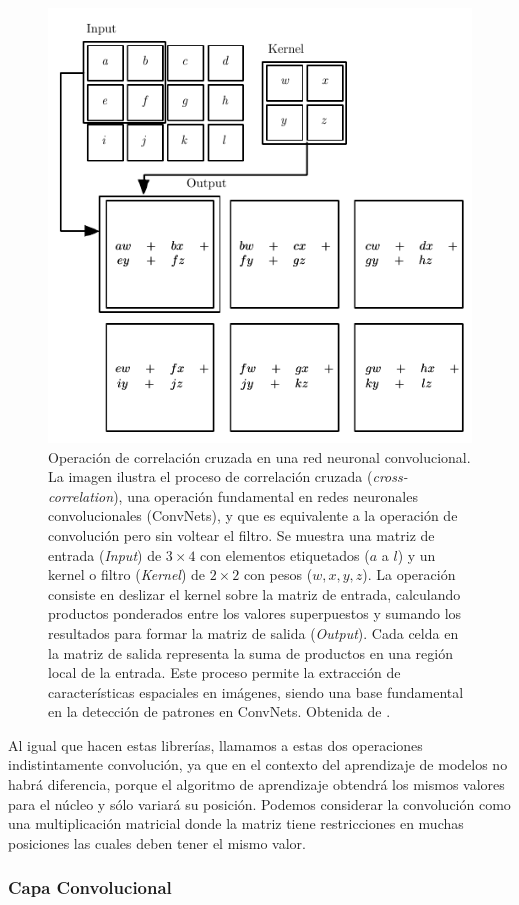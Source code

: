 \begin{figure}
    \centering
    \includegraphics[width=0.5\linewidth]{Plantilla_TFG_latex//imagenes//Inf//2.Fund/Conv.png}
    \caption[Operación de correlación cruzada en una red neuronal convolucional]{Operación de correlación cruzada en una red neuronal convolucional. La imagen ilustra el proceso de correlación cruzada (\textit{cross-correlation}), una operación fundamental en redes neuronales convolucionales (ConvNets), y que es equivalente a la operación de convolución pero sin voltear el filtro. Se muestra una matriz de entrada (\textit{Input}) de 
$3 \times 4$ con elementos etiquetados ($a$ a $l$) y un kernel o filtro (\textit{Kernel}) de $2 \times 2$ con pesos ($w,x,y,z$). La operación consiste en deslizar el kernel sobre la matriz de entrada, calculando productos ponderados entre los valores superpuestos y sumando los resultados para formar la matriz de salida (\textit{Output}). Cada celda en la matriz de salida representa la suma de productos en una región local de la entrada. Este proceso permite la extracción de características espaciales en imágenes, siendo una base fundamental en la detección de patrones en ConvNets. Obtenida de \cite{GoodFellowBook}.}
    \label{fig:3.Conv}
\end{figure}


Al igual que hacen estas librerías, llamamos a estas dos operaciones indistintamente convolución, ya que en el contexto del aprendizaje de modelos no habrá diferencia, porque el algoritmo de aprendizaje obtendrá los mismos valores para el núcleo y sólo variará su posición. Podemos considerar la convolución como una multiplicación matricial donde la matriz tiene restricciones en muchas posiciones las cuales deben tener el mismo valor.

\subsubsection{Capa Convolucional}


